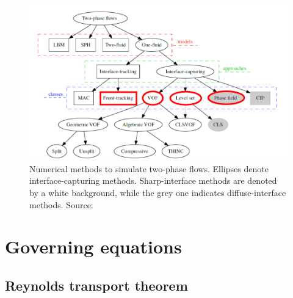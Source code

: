 \begin{figure}[h!]
	\centering
	\includegraphics[scale=1.0]{./part1_numerical_approaches/figures_ch2/classification_numerical_methods_mirjalili}
	\caption[Numerical methods to simulate two-phase flows.]{Numerical methods to simulate two-phase flows. Ellipses denote interface-capturing methods. Sharp-interface methods are denoted by a white background, while the grey one indicates diffuse-interface methods. Source: }
	\label{fig:classification_numerical_methods_mirjalili}
\end{figure}



\section{Governing equations }
\label{sec:ch2_governing_equations}

\subsection{Reynolds transport theorem}

